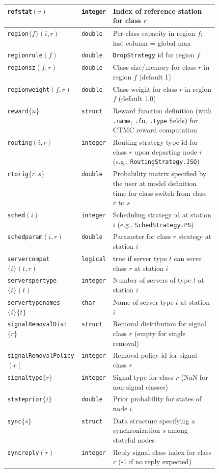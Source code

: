\begin{MATLAB}
\begin{table}[thbp]
{\begin{tabular}{|l|l|p{0.5\linewidth}|}
\texttt{refstat}$(r)$ & \texttt{integer} & Index of reference station for class $r$ \\\hline
\texttt{region}$\{f\}(i,r)$ & \texttt{double} & Per-class capacity in region $f$; last column = global max\\\hline
\texttt{regionrule}$(f)$ & \texttt{double} & \texttt{DropStrategy} id for region $f$\\\hline
\texttt{regionsz}$(f,r)$ & \texttt{double} & Class size/memory for class $r$ in region $f$ (default 1)\\\hline
\texttt{regionweight}$(f,r)$ & \texttt{double} & Class weight for class $r$ in region $f$ (default 1.0)\\\hline
\texttt{reward}$\{n\}$ & \texttt{struct} & Reward function definition (with \texttt{.name}, \texttt{.fn}, \texttt{.type} fields) for CTMC reward computation\\\hline
\texttt{routing}$(i,r)$ & \texttt{integer} & Routing strategy type id for class $r$ upon departing node $i$ (e.g., \texttt{RoutingStrategy.JSQ})\\\hline
\texttt{rtorig}$\{r,s\}$  & \texttt{double} & Probability matrix specified by the user at model definition time for class switch from class $r$ to $s$\\\hline
\texttt{sched}$(i)$ & \texttt{integer} & Scheduling strategy id at station $i$ (e.g., \texttt{SchedStrategy.PS})\\\hline
\texttt{schedparam}$(i,r)$ & \texttt{double} &  Parameter for class $r$ strategy at station $i$\\\hline
\texttt{servercompat}$\{i\}(t,r)$ & \texttt{logical} & true if server type $t$ can serve class $r$ at station $i$\\\hline
\texttt{serverspertype}$\{i\}(t)$ & \texttt{integer} & Number of servers of type $t$ at station $i$\\\hline
\texttt{servertypenames}$\{i\}\{t\}$ & \texttt{char} & Name of server type $t$ at station $i$\\\hline
\texttt{signalRemovalDist}$\{r\}$ & \texttt{struct} & Removal distribution for signal class $r$ (empty for single removal)\\\hline
\texttt{signalRemovalPolicy}$(r)$ & \texttt{integer} & Removal policy id for signal class $r$\\\hline
\texttt{signaltype}$\{r\}$ & \texttt{integer} & Signal type for class $r$ (NaN for non-signal classes)\\\hline
\texttt{stateprior}$\{i\}$ & \texttt{double} & Prior probability for states of node $i$\\\hline
\texttt{sync}$\{s\}$ & \texttt{struct} & Data structure specifying a synchronization $s$ among stateful nodes\\\hline
\texttt{syncreply}$(r)$ & \texttt{integer} & Reply signal class index for class $r$ (-1 if no reply expected)\\\hline
\end{tabular}
}
\end{table}
\end{MATLAB}
